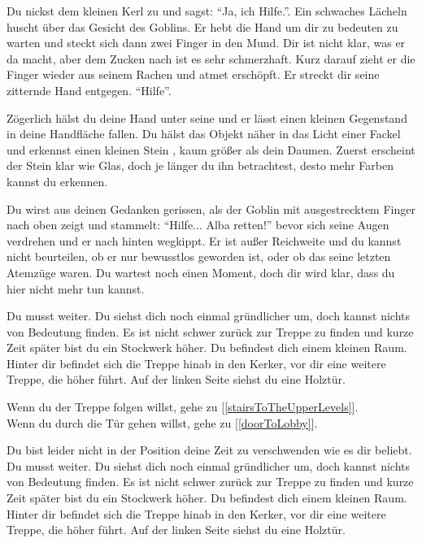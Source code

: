 
Du nickst dem kleinen Kerl zu und sagst: ``Ja, ich Hilfe.''. Ein schwaches Lächeln huscht über das Gesicht des Goblins. Er hebt die Hand um dir zu bedeuten zu warten und steckt sich dann zwei Finger in den Mund. Dir ist nicht klar, was er da macht, aber dem Zucken nach ist es sehr schmerzhaft. Kurz darauf zieht er die Finger wieder aus seinem Rachen und atmet erschöpft. Er streckt dir seine zitternde Hand entgegen. ``Hilfe''.

Zögerlich hälst du deine Hand unter seine und er lässt einen kleinen Gegenstand in deine Handfläche fallen. Du hälst das Objekt näher in das Licht einer Fackel und erkennst einen kleinen Stein , kaum größer als dein Daumen. Zuerst erscheint der Stein klar wie Glas, doch je länger du ihn betrachtest, desto mehr Farben kannst du erkennen.

Du wirst aus deinen Gedanken gerissen, als der Goblin mit ausgestrecktem Finger nach oben zeigt und stammelt: ``Hilfe... Alba retten!'' bevor sich seine Augen verdrehen und er nach hinten wegkippt. Er ist außer Reichweite und du kannst nicht beurteilen, ob er nur bewusstlos geworden ist, oder ob das seine letzten Atemzüge waren. Du wartest noch einen Moment, doch dir wird klar, dass du hier nicht mehr tun kannst.

Du musst weiter. Du siehst dich noch einmal gründlicher um, doch kannst nichts von Bedeutung finden. Es ist nicht schwer zurück zur Treppe zu finden und kurze Zeit später bist du ein Stockwerk höher. Du befindest dich einem kleinen Raum. Hinter dir befindet sich die Treppe hinab in den Kerker, vor dir eine weitere Treppe, die höher führt. Auf der linken Seite siehst du eine Holztür.

Wenn du der Treppe folgen willst, gehe zu [\ref{stairsToTheUpperLevels}].
\\Wenn du durch die Tür gehen willst, gehe zu [\ref{doorToLobby}].


Du bist leider nicht in der Position deine Zeit zu verschwenden wie es dir beliebt. Du musst weiter. Du siehst dich noch einmal gründlicher um, doch kannst nichts von Bedeutung finden. Es ist nicht schwer zurück zur Treppe zu finden und kurze Zeit später bist du ein Stockwerk höher. Du befindest dich einem kleinen Raum. Hinter dir befindet sich die Treppe hinab in den Kerker, vor dir eine weitere Treppe, die höher führt. Auf der linken Seite siehst du eine Holztür.


